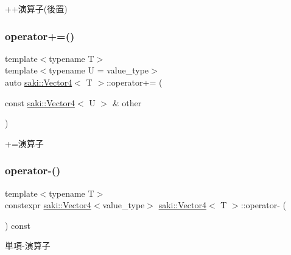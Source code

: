++演算子(後置) 

\mbox{\label{classsaki_1_1_vector4_ae790a71f69947ad55e7d6f83a3138322}} 
\subsubsection{\texorpdfstring{operator+=()}{operator+=()}}
{\footnotesize\ttfamily template$<$typename T$>$ \\
template$<$typename U  = value\+\_\+type$>$ \\
auto \mbox{\hyperlink{classsaki_1_1_vector4}{saki\+::\+Vector4}}$<$ T $>$\+::operator+= (\begin{DoxyParamCaption}\item[{const \mbox{\hyperlink{classsaki_1_1_vector4}{saki\+::\+Vector4}}$<$ U $>$ \&}]{other }\end{DoxyParamCaption})\hspace{0.3cm}{\ttfamily [inline]}}



+=演算子 

\mbox{\label{classsaki_1_1_vector4_a23fdd521d8b4839844359bdf2e746a6a}} 
\subsubsection{\texorpdfstring{operator-\/()}{operator-()}}
{\footnotesize\ttfamily template$<$typename T$>$ \\
constexpr \mbox{\hyperlink{classsaki_1_1_vector4}{saki\+::\+Vector4}}$<$value\+\_\+type$>$ \mbox{\hyperlink{classsaki_1_1_vector4}{saki\+::\+Vector4}}$<$ T $>$\+::operator-\/ (\begin{DoxyParamCaption}{ }\end{DoxyParamCaption}) const\hspace{0.3cm}{\ttfamily [inline]}}



単項-\/演算子 

\mbox{\label{classsaki_1_1_vector4_af1ad8ad75a0123a8c54c909c91c866cd}} 
